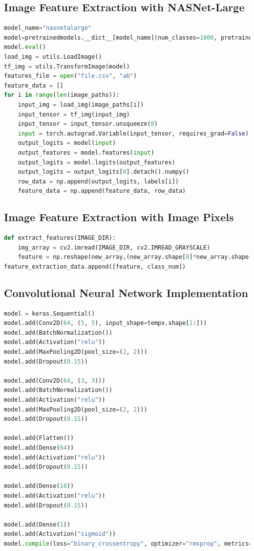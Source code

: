 \documentclass[12pt]{article}
\numberwithin{figure}{section} %
\begin{document}
\subsection{Image Feature Extraction with NASNet-Large}
\label{subsection:Image Feature Extraction with NASNet-Large}
\begin{lstlisting}[language = Python]
model_name="nasnetalarge"
model=pretrainedmodels.__dict__[model_name](num_classes=1000, pretrained='imagenet')
model.eval()
load_img = utils.LoadImage()
tf_img = utils.TransformImage(model)
features_file = open("file.csv", "ab")
feature_data = []
for i in range(len(image_paths)):
    input_img = load_img(image_paths[i])
    input_tensor = tf_img(input_img)
    input_tensor = input_tensor.unsqueeze(0)
    input = torch.autograd.Variable(input_tensor, requires_grad=False)
    output_logits = model(input)
    output_features = model.features(input)
    output_logits = model.logits(output_features)
    output_logits = output_logits[0].detach().numpy()
    row_data = np.append(output_logits, labels[i])
    feature_data = np.append(feature_data, row_data)
\end{lstlisting}

\subsection{Image Feature Extraction with Image Pixels}
\label{subsection:Image Feature Extraction with Image Pixels}
\begin{lstlisting}[language = Python]
def extract_features(IMAGE_DIR): 
    img_array = cv2.imread(IMAGE_DIR, cv2.IMREAD_GRAYSCALE)
    feature = np.reshape(new_array,(new_array.shape[0]*new_array.shape[1]))
feature_extraction_data.append([feature, class_num])  
\end{lstlisting}

\subsection{Convolutional Neural Network Implementation}
\label{subsection:Convolutional Neural Network Implementation}
\begin{lstlisting}[language = Python]
model = keras.Sequential()
model.add(Conv2D(64, (5, 5), input_shape=tempx.shape[1:]))
model.add(BatchNormalization())
model.add(Activation("relu"))
model.add(MaxPooling2D(pool_size=(2, 2)))
model.add(Dropout(0.15))

model.add(Conv2D(64, (3, 3)))
model.add(BatchNormalization())
model.add(Activation("relu"))
model.add(MaxPooling2D(pool_size=(2, 2)))
model.add(Dropout(0.15))

model.add(Flatten())
model.add(Dense(64))
model.add(Activation("relu"))
model.add(Dropout(0.15))

model.add(Dense(10))
model.add(Activation("relu"))
model.add(Dropout(0.15))

model.add(Dense(1))
model.add(Activation("sigmoid"))
model.compile(loss="binary_crossentropy", optimizer="rmsprop", metrics=["accuracy"])
\end{lstlisting}
\end{document}
